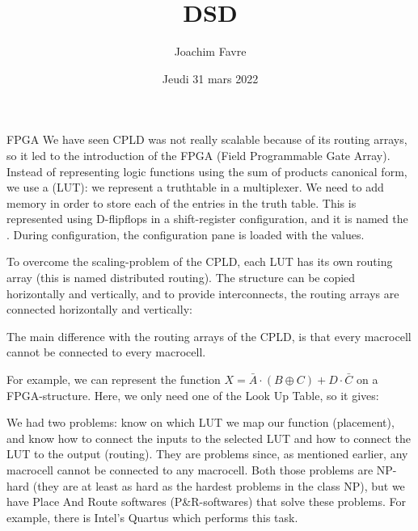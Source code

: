\documentclass[a4paper]{article}
\title{DSD}
\author{Joachim Favre}
\date{Jeudi 31 mars 2022}
\begin{document}
\maketitle


\begin{parag}{FPGA}
    We have seen CPLD was not really scalable because of its routing arrays, so it led to the introduction of the FPGA (Field Programmable Gate Array). Instead of representing logic functions using the sum of products canonical form, we use a  (LUT): we represent a truthtable in a multiplexer. We need to add memory in order to store each of the entries in the truth table. This is represented using D-flipflops in a shift-register configuration, and it is named the . During configuration, the configuration pane is loaded with the values.

     To overcome the scaling-problem of the CPLD, each LUT has its own routing array (this is named distributed routing). The structure can be copied horizontally and vertically, and to provide interconnects, the routing arrays are connected horizontally and vertically:

    The main difference with the routing arrays of the CPLD, is that every macrocell cannot be connected to every macrocell.

    For example, we can represent the function $X = \bar{A} \cdot \left(B \oplus C\right) + D \cdot \bar{C}$ on a FPGA-structure. Here, we only need one of the Look Up Table, so it gives:

    We had two problems: know on which LUT we map our function (placement), and know how to connect the inputs to the selected LUT and how to connect the LUT to the output (routing). They are problems since, as mentioned earlier, any macrocell cannot be connected to any macrocell. Both those problems are NP-hard (they are at least as hard as the hardest problems in the class NP), but we have Place And Route softwares (P\&R-softwares) that solve these problems. For example, there is Intel's Quartus which performs this task.


\end{parag}
\end{document}
